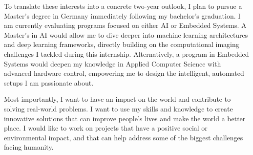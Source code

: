 \documentclass[12pt,a4paper]{article}
\begin{document}
To translate these interests into a concrete two-year outlook, I plan to pursue a Master's degree in Germany immediately following my bachelor's graduation. I am currently evaluating programs focused on either AI or Embedded Systems. A Master's in AI would allow me to dive deeper into machine learning architectures and deep learning frameworks, directly building on the computational imaging challenges I tackled during this internship. Alternatively, a program in Embedded Systems would deepen my knowledge in Applied Computer Science with advanced hardware control, empowering me to design the intelligent, automated setups I am passionate about.

Most importantly, I want to have an impact on the world and contribute to solving real-world problems. I want to use my skills and knowledge to create innovative solutions that can improve people's lives and make the world a better place. I would like to work on projects that have a positive social or environmental impact, and that can help address some of the biggest challenges facing humanity.
\end{document}
